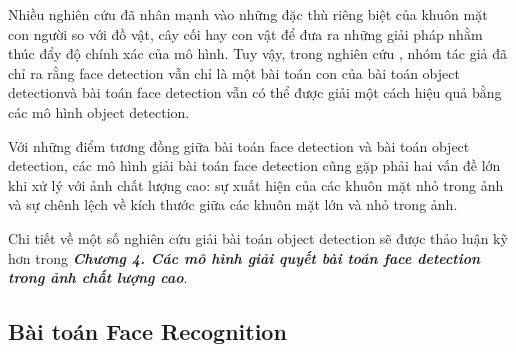 {    \noindent
    Nhiều nghiên cứu đã nhân mạnh vào những đặc thù riêng biệt của khuôn mặt con người so với đồ vật, cây cối hay con vật để đưa ra những giải pháp nhằm thúc đẩy độ chính xác của mô hình.
    Tuy vậy, trong nghiên cứu \cite{zhu2020tinaface}, nhóm tác giả đã chỉ ra rằng face detection vẫn chỉ là một bài toán con của bài toán object detectionvà bài toán face detection vẫn có thể được giải một cách hiệu quả bằng các mô hình object detection.

    \noindent
    Với những điểm tương đồng giữa bài toán face detection và bài toán object detection, các mô hình giải bài toán face detection cũng gặp phải hai vấn đề lớn khi xử lý với ảnh chất lượng cao: sự xuất hiện của các khuôn mặt nhỏ trong ảnh và sự chênh lệch về kích thước giữa các khuôn mặt lớn và nhỏ trong ảnh.
    
    \noindent
    Chi tiết về một số nghiên cứu giải bài toán object detection sẽ được thảo luận kỹ hơn trong \textbf{\textit{Chương 4. Các mô hình giải quyết bài toán face detection trong ảnh chất lượng cao}}.

    \subsection{Bài toán Face Recognition}
}